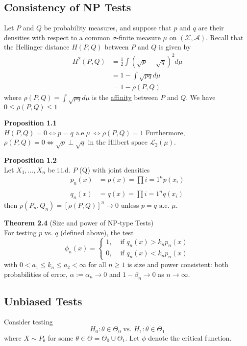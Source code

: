 \documentclass[12pt]{article}
\numberwithin{equation}{section}
\begin{document}
\subsection{Consistency of NP Tests}
Let $P$ and $Q$ be probability measures, and suppose that $p$ and $q$ are their densities with respect to a common $\sigma$-finite measure $\mu$ on $(\mathcal{X}, \mathcal{A})$. Recall that the Hellinger distance $H(P,Q)$ between $P$ and $Q$ is given by
\begin{align*}
  H^2(P, Q) &= \frac{1}{2} \int \left( \sqrt{p} - \sqrt{q} \right)^2 d\mu \\
  &= 1 - \int \sqrt{pq} d\mu \\
  &= 1 - \rho(P, Q)
\end{align*}
where $\rho(P, Q) = \int \sqrt{pq} d\mu$ is the \underline{affinity} between $P$ and $Q$. We have $0 \le \rho(P, Q) \le 1$

\textbf{Proposition 1.1} \\
$H(P, Q) = 0 \iff p = q \text{ a.e.}\mu \ \iff \rho(P, Q) = 1$ Furthermore, $\rho(P, Q) = 0 \iff \sqrt{p} \perp \sqrt{q}$ in the Hilbert space $\mathcal{L}_2(\mu)$.

\textbf{Proposition 1.2} \\
Let $X_1, \ldots, X_n$ be i.i.d. $P$ (Q) with joint densities
\begin{align*}
  p_n(x) &= p(x) = \prod{i=1}^n p(x_i) \\ \\
  q_n(x) &= q(x) = \prod{i=1}^n q(x_i)
\end{align*}
%
then $\rho(P_n, Q_n) = [\rho(P, Q)]^n \to 0$ unless $p = q \text{ a.e. } \mu$. 

\textbf{Theorem 2.4} (Size and power of NP-type Tests) \\
For testing $p$ vs. $q$ (defined above), the test 
\begin{equation*}
  \phi_n(x) = 
  \begin{cases}
    1, & \text{ if } q_n(x) > k_n p_n(x) \\
    0, & \text{ if } q_n(x) < k_n p_n(x)
  \end{cases}
\end{equation*}
with $0 < a_1 \le k_n \le a_2 < \infty$ for all $n \ge 1$ is size and power consistent: both probabilities of error, $\alpha := \alpha_n \to 0$ and $1 - \beta_n \to 0$ as $n \to \infty$.

\subsection{Unbiased Tests} 
Consider testing
\begin{equation*}
  H_0: \theta \in \Theta_0 \text{ vs. }  H_1: \theta \in \Theta_1
\end{equation*}
where $X \sim P_{\theta}$ for some $\theta \in \Theta = \Theta_0 \cup \Theta_1$. Let $\phi$ denote the critical function.
\end{document}
